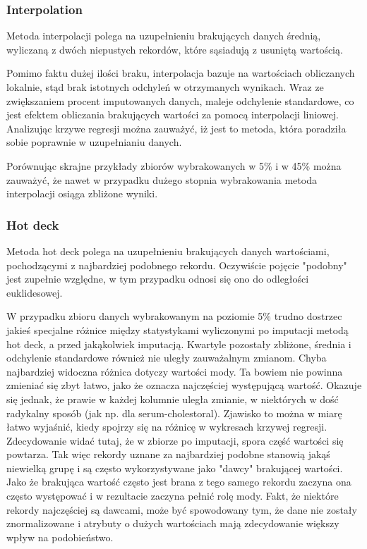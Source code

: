 \documentclass{classrep}
\begin{document}
{        \subsubsection{Interpolation}
        \label{summary:interpolation} {
            Metoda interpolacji polega na uzupełnieniu brakujących danych średnią,
            wyliczaną z dwóch niepustych rekordów, które sąsiadują z usuniętą wartością.

            Pomimo faktu dużej ilości braku, interpolacja bazuje na wartościach
            obliczanych lokalnie, stąd brak istotnych odchyleń w otrzymanych wynikach.
            Wraz ze zwiększaniem procent imputowanych danych, maleje odchylenie
            standardowe, co jest efektem obliczania brakujących wartości za pomocą
            interpolacji liniowej. Analizując krzywe regresji można zauważyć, iż jest
            to metoda, która poradziła sobie poprawnie w uzupełnianiu danych.

            Porównując skrajne przykłady zbiorów wybrakowanych w 5\% i w 45\% można
            zauważyć, że nawet w przypadku dużego stopnia wybrakowania metoda
            interpolacji osiąga zbliżone wyniki.
        }

        \subsubsection{Hot deck}
        \label{summary:dot-deck} {
            Metoda hot deck polega na uzupełnieniu brakujących danych wartościami, pochodzącymi z najbardziej
            podobnego rekordu. Oczywiście pojęcie "podobny" jest zupełnie względne, w tym przypadku odnosi się ono
            do odległości euklidesowej.

            W przypadku zbioru danych wybrakowanym na poziomie 5\% trudno dostrzec
            jakieś specjalne różnice między statystykami wyliczonymi po imputacji
            metodą hot deck, a przed jakąkolwiek imputacją. Kwartyle pozostały
            zbliżone, średnia i odchylenie standardowe również nie uległy zauważalnym
            zmianom. Chyba najbardziej widoczna różnica dotyczy wartości mody. Ta
            bowiem nie powinna zmieniać się zbyt łatwo, jako że oznacza najczęściej
            występującą wartość. Okazuje się jednak, że prawie w każdej kolumnie uległa
            zmianie, w niektórych w dość radykalny sposób (jak np. dla
            serum-cholestoral). Zjawisko to można w miarę łatwo wyjaśnić, kiedy spojrzy
            się na różnicę w wykresach krzywej regresji. Zdecydowanie widać tutaj, że w
            zbiorze po imputacji, spora część wartości się powtarza. Tak więc rekordy
            uznane za najbardziej podobne stanowią jakąś niewielką grupę i są często
            wykorzystywane jako "dawcy" brakującej wartości. Jako że brakująca wartość
            często jest brana z tego samego rekordu zaczyna ona często występować i w
            rezultacie zaczyna pełnić rolę mody. Fakt, że niektóre rekordy najczęściej
            są dawcami, może być spowodowany tym, że dane nie zostały znormalizowane i
            atrybuty o dużych wartościach mają zdecydowanie większy wpływ na podobieństwo.

}}
\end{document}
